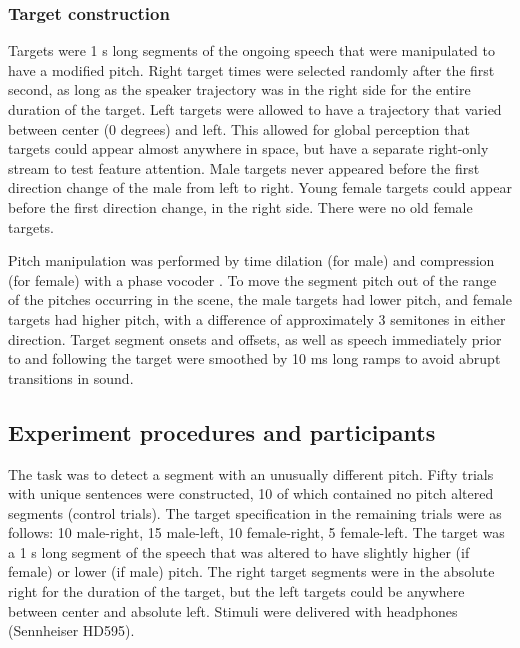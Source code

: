 \documentclass[9pt,twocolumn,twoside]{pnas-new}
\begin{document}
{\subsubsection{Target construction} Targets were 1 s long segments of the ongoing speech that were manipulated to have a modified pitch. Right target times were selected randomly after the first second, as long as the speaker trajectory was in the right side for the entire duration of the target. Left targets were allowed to have a trajectory that varied between center (0 degrees) and left. This allowed for global perception that targets could appear almost anywhere in space, but have a separate right-only stream to test feature attention. Male targets never appeared before the first direction change of the male from left to right. Young female targets could appear before the first direction change, in the right side. There were no old female targets. 

Pitch manipulation was performed by time dilation (for male) and compression (for female) with a phase vocoder \cite{de2000traditional}. To move the segment pitch out of the range of the pitches occurring in the scene, the male targets had lower pitch, and female targets had higher pitch, with a difference of approximately 3 semitones in either direction. Target segment onsets and offsets, as well as speech immediately prior to and following the target were smoothed by 10 ms long ramps to avoid abrupt transitions in sound.


\subsection{Experiment procedures and participants} The task was to detect a segment with an unusually different pitch. Fifty trials with unique sentences were constructed, 10 of which contained no pitch altered segments (control trials). The target specification in the remaining trials were as follows: 10 male-right, 15 male-left, 10 female-right, 5 female-left. The target was a 1 s long segment of the speech that was altered to have slightly higher (if female) or lower (if male) pitch. The right target segments were in the absolute right for the duration of the target, but the left targets could be anywhere between center and absolute left. Stimuli were delivered with headphones (Sennheiser HD595).

}
\end{document}
